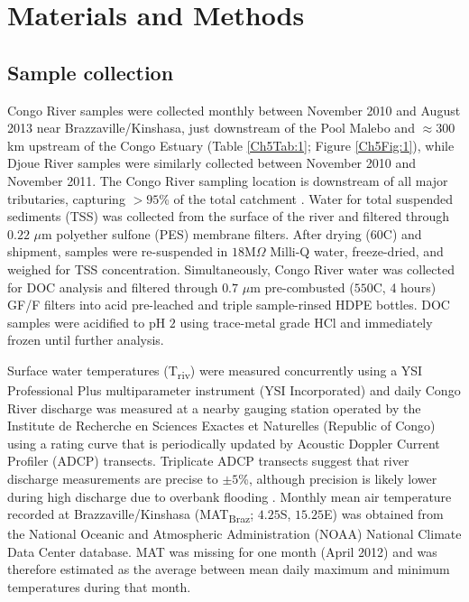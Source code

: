 \section{Materials and Methods}

\subsection{Sample collection}

Congo River samples were collected monthly between November 2010 and August 2013 near Brazzaville/Kinshasa, just downstream of the Pool Malebo and $\approx 300$ km upstream of the Congo Estuary (Table \ref{Ch5Tab:1}; Figure \ref{Ch5Fig:1}), while Djoue River samples were similarly collected between November 2010 and November 2011. The Congo River sampling location is downstream of all major tributaries, capturing $>95$\% of the total catchment \citep{Spencer:2012en}. Water for total suspended sediments (TSS) was collected from the surface of the river and filtered through $0.22$ $\mu$m polyether sulfone (PES) membrane filters. After drying ($60$\textdegree C) and shipment, samples were re-suspended in $18$M$\Omega$ Milli-Q water, freeze-dried, and weighed for TSS concentration. Simultaneously, Congo River water was collected for DOC analysis and filtered through $0.7$ $\mu$m pre-combusted ($550$\textdegree C, 4 hours) GF/F filters into acid pre-leached and triple sample-rinsed HDPE bottles. DOC samples were acidified to pH $2$ using trace-metal grade HCl and immediately frozen until further analysis.

Surface water temperatures (T\textsubscript{riv}) were measured concurrently using a YSI Professional Plus multiparameter instrument (YSI Incorporated) and daily Congo River discharge was measured at a nearby gauging station operated by the Institute de Recherche en Sciences Exactes et Naturelles (Republic of Congo) using a rating curve that is periodically updated by Acoustic Doppler Current Profiler (ADCP) transects. Triplicate ADCP transects suggest that river discharge measurements are precise to $\pm 5$\%, although precision is likely lower during high discharge due to overbank flooding \citep{Spencer:2014vp}. Monthly mean air temperature recorded at Brazzaville/Kinshasa (MAT\textsubscript{Braz}; $4.25$\textdegree S, $15.25$\textdegree E) was obtained from the National Oceanic and Atmospheric Administration (NOAA) National Climate Data Center database. MAT was missing for one month (April 2012) and was therefore estimated as the average between mean daily maximum and minimum temperatures during that month. 

